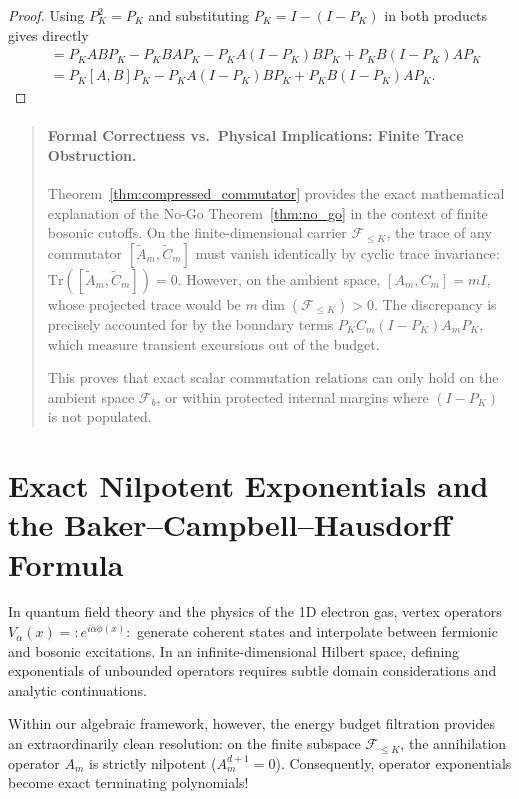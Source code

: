 \begin{proof}
Using $P_K^2=P_K$ and substituting $P_K=I-(I-P_K)$ in both products gives directly
\begin{align}
[P_KAP_K,P_KBP_K]
&=P_KABP_K-P_KBA P_K-P_KA(I-P_K)BP_K+P_KB(I-P_K)AP_K\\
&=P_K[A,B]P_K-P_KA(I-P_K)BP_K+P_KB(I-P_K)AP_K.
\end{align}
\end{proof}

\begin{quote}
\item[]\paragraph{Formal Correctness vs.\ Physical Implications: Finite Trace Obstruction.}
Theorem~\ref{thm:compressed_commutator} provides the exact mathematical explanation of the No-Go Theorem~\ref{thm:no_go} in the context of finite bosonic cutoffs. On the finite-dimensional carrier $\mathcal{F}_{\le K}$, the trace of any commutator $[\tilde{A}_m, \tilde{C}_m]$ must vanish identically by cyclic trace invariance: $\mathrm{Tr}([\tilde{A}_m, \tilde{C}_m]) = 0$. However, on the ambient space, $[A_m, C_m] = m I$, whose projected trace would be $m \dim(\mathcal{F}_{\le K}) > 0$. The discrepancy is precisely accounted for by the boundary terms $P_K C_m (I - P_K) A_m P_K$, which measure transient excursions out of the budget. 

This proves that exact scalar commutation relations can only hold on the ambient space $\mathcal{F}_b$, or within protected internal margins where $(I - P_K)$ is not populated.

\end{quote}

\section{Exact Nilpotent Exponentials and the Baker--Campbell--Hausdorff Formula}

In quantum field theory and the physics of the 1D electron gas, vertex operators $V_\alpha(x) = :e^{i \alpha \phi(x)}:$ generate coherent states and interpolate between fermionic and bosonic excitations. In an infinite-dimensional Hilbert space, defining exponentials of unbounded operators requires subtle domain considerations and analytic continuations. 

Within our algebraic framework, however, the energy budget filtration provides an extraordinarily clean resolution: on the finite subspace $\mathcal{F}_{\le K}$, the annihilation operator $A_m$ is strictly nilpotent ($A_m^{d+1} = 0$). Consequently, operator exponentials become exact terminating polynomials!

